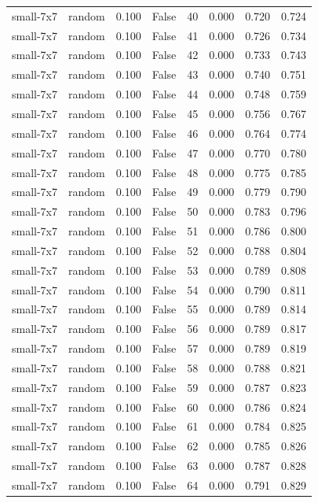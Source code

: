 \begin{tabular}{llrrrrrr}
small-7x7 & random & 0.100 & False & 40 & 0.000 & 0.720 & 0.724 \\
small-7x7 & random & 0.100 & False & 41 & 0.000 & 0.726 & 0.734 \\
small-7x7 & random & 0.100 & False & 42 & 0.000 & 0.733 & 0.743 \\
small-7x7 & random & 0.100 & False & 43 & 0.000 & 0.740 & 0.751 \\
small-7x7 & random & 0.100 & False & 44 & 0.000 & 0.748 & 0.759 \\
small-7x7 & random & 0.100 & False & 45 & 0.000 & 0.756 & 0.767 \\
small-7x7 & random & 0.100 & False & 46 & 0.000 & 0.764 & 0.774 \\
small-7x7 & random & 0.100 & False & 47 & 0.000 & 0.770 & 0.780 \\
small-7x7 & random & 0.100 & False & 48 & 0.000 & 0.775 & 0.785 \\
small-7x7 & random & 0.100 & False & 49 & 0.000 & 0.779 & 0.790 \\
small-7x7 & random & 0.100 & False & 50 & 0.000 & 0.783 & 0.796 \\
small-7x7 & random & 0.100 & False & 51 & 0.000 & 0.786 & 0.800 \\
small-7x7 & random & 0.100 & False & 52 & 0.000 & 0.788 & 0.804 \\
small-7x7 & random & 0.100 & False & 53 & 0.000 & 0.789 & 0.808 \\
small-7x7 & random & 0.100 & False & 54 & 0.000 & 0.790 & 0.811 \\
small-7x7 & random & 0.100 & False & 55 & 0.000 & 0.789 & 0.814 \\
small-7x7 & random & 0.100 & False & 56 & 0.000 & 0.789 & 0.817 \\
small-7x7 & random & 0.100 & False & 57 & 0.000 & 0.789 & 0.819 \\
small-7x7 & random & 0.100 & False & 58 & 0.000 & 0.788 & 0.821 \\
small-7x7 & random & 0.100 & False & 59 & 0.000 & 0.787 & 0.823 \\
small-7x7 & random & 0.100 & False & 60 & 0.000 & 0.786 & 0.824 \\
small-7x7 & random & 0.100 & False & 61 & 0.000 & 0.784 & 0.825 \\
small-7x7 & random & 0.100 & False & 62 & 0.000 & 0.785 & 0.826 \\
small-7x7 & random & 0.100 & False & 63 & 0.000 & 0.787 & 0.828 \\
small-7x7 & random & 0.100 & False & 64 & 0.000 & 0.791 & 0.829 \\

\end{tabular}
